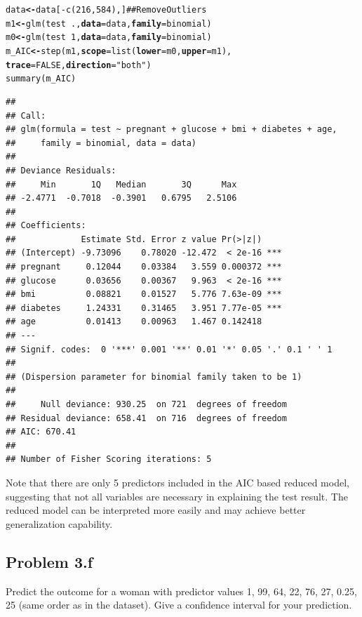 \documentclass[12pt,oneside,a4paper]{article}\usepackage[]{graphicx}\usepackage[]{xcolor}
\makeatletter
\newcommand{\hlnum}[1]{\textcolor[rgb]{0,0,0}{#1}}%
\newcommand{\hlstr}[1]{\textcolor[rgb]{0,0,1}{#1}}%
\newcommand{\hlcom}[1]{\textcolor[rgb]{0.443,0.478,0.702}{#1}}%
\newcommand{\hlopt}[1]{\textcolor[rgb]{0,0,0}{#1}}%
\newcommand{\hlstd}[1]{\textcolor[rgb]{0,0,0}{#1}}%
\newcommand{\hlkwb}[1]{\textcolor[rgb]{0.498,0,0.333}{\textbf{#1}}}%
\newcommand{\hlkwc}[1]{\textcolor[rgb]{0.498,0,0.333}{\textbf{#1}}}%
\newcommand{\hlkwd}[1]{\textcolor[rgb]{0,0,0}{#1}}%
\newenvironment{kframe}{%
 \def\at@end@of@kframe{}%
 \ifinner\ifhmode%
  \def\at@end@of@kframe{\end{minipage}}%
  \begin{minipage}{\columnwidth}%
 \fi\fi%
 \def\FrameCommand##1{\hskip\@totalleftmargin \hskip-\fboxsep
 \colorbox{shadecolor}{##1}\hskip-\fboxsep
     \hskip-\linewidth \hskip-\@totalleftmargin \hskip\columnwidth}%
 \MakeFramed {\advance\hsize-\width
   \@totalleftmargin\z@ \linewidth\hsize
   \@setminipage}}%
 {\par\unskip\endMakeFramed%
 \at@end@of@kframe}
\newenvironment{knitrout}{}{} %
\newcommand{\subproblem}[1]
{
    \subsection*{Problem {#1}}
}
\makeatother
\begin{document}
\begin{knitrout}
\color{fgcolor}\begin{kframe}
\begin{alltt}
\hlstd{data} \hlkwb{<-} \hlstd{data[}\hlopt{-}\hlkwd{c}\hlstd{(}\hlnum{216}\hlstd{,}\hlnum{584}\hlstd{), ]} \hlcom{##Remove Outliers}
\hlstd{m1} \hlkwb{<-} \hlkwd{glm}\hlstd{(test} \hlopt{~} \hlstd{.,} \hlkwc{data} \hlstd{= data,} \hlkwc{family} \hlstd{= binomial)}
\hlstd{m0} \hlkwb{<-} \hlkwd{glm}\hlstd{(test} \hlopt{~} \hlnum{1}\hlstd{,} \hlkwc{data} \hlstd{= data,} \hlkwc{family} \hlstd{= binomial)}
\hlstd{m_AIC} \hlkwb{<-} \hlkwd{step}\hlstd{(m1,} \hlkwc{scope} \hlstd{=} \hlkwd{list}\hlstd{(}\hlkwc{lower} \hlstd{= m0,} \hlkwc{upper} \hlstd{= m1),}
              \hlkwc{trace} \hlstd{=} \hlnum{FALSE}\hlstd{,} \hlkwc{direction} \hlstd{=} \hlstr{"both"}\hlstd{)}
\hlkwd{summary}\hlstd{(m_AIC)}
\end{alltt}
\begin{verbatim}
## 
## Call:
## glm(formula = test ~ pregnant + glucose + bmi + diabetes + age, 
##     family = binomial, data = data)
## 
## Deviance Residuals: 
##     Min       1Q   Median       3Q      Max  
## -2.4771  -0.7018  -0.3901   0.6795   2.5106  
## 
## Coefficients:
##             Estimate Std. Error z value Pr(>|z|)    
## (Intercept) -9.73096    0.78020 -12.472  < 2e-16 ***
## pregnant     0.12044    0.03384   3.559 0.000372 ***
## glucose      0.03656    0.00367   9.963  < 2e-16 ***
## bmi          0.08821    0.01527   5.776 7.63e-09 ***
## diabetes     1.24331    0.31465   3.951 7.77e-05 ***
## age          0.01413    0.00963   1.467 0.142418    
## ---
## Signif. codes:  0 '***' 0.001 '**' 0.01 '*' 0.05 '.' 0.1 ' ' 1
## 
## (Dispersion parameter for binomial family taken to be 1)
## 
##     Null deviance: 930.25  on 721  degrees of freedom
## Residual deviance: 658.41  on 716  degrees of freedom
## AIC: 670.41
## 
## Number of Fisher Scoring iterations: 5
\end{verbatim}
\end{kframe}
\end{knitrout}

Note that there are only 5 predictors included in the AIC based reduced model, suggesting that not all variables are necessary in explaining the test result. The reduced model can be interpreted more easily and may achieve better generalization capability.

\subproblem{3.f}
Predict the outcome for a woman with predictor values 1, 99, 64, 22, 76, 27, 0.25, 25 (same order as in the dataset). Give a confidence interval for your prediction.
\end{document}
